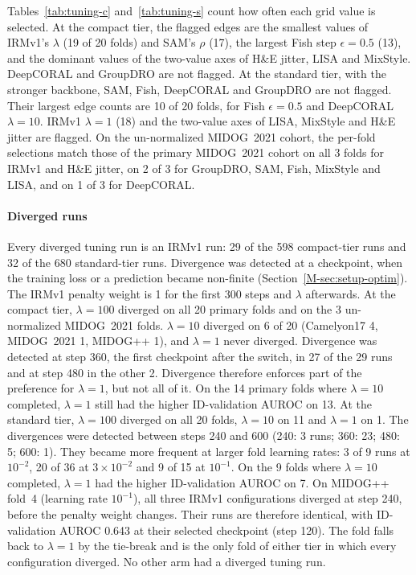 Tables~\ref{tab:tuning-c} and~\ref{tab:tuning-s} count how often each grid
value is selected. At the compact tier, the flagged edges are the smallest
values of IRMv1's $\lambda$ (19 of 20 folds) and SAM's $\rho$ (17), the largest
Fish step $\epsilon=0.5$ (13), and the dominant values of the two-value axes
of H\&E jitter, LISA and MixStyle. DeepCORAL and GroupDRO are not flagged. At
the standard tier, with the stronger backbone, SAM, Fish, DeepCORAL and
GroupDRO are not flagged. Their largest edge counts are 10 of 20 folds, for
Fish $\epsilon=0.5$ and DeepCORAL $\lambda=10$. IRMv1 $\lambda=1$ (18) and the
two-value axes of LISA, MixStyle and H\&E jitter are flagged. On the un-normalized
MIDOG~2021 cohort, the per-fold selections match those of the primary MIDOG~2021
cohort on all 3 folds for IRMv1 and H\&E jitter, on 2 of 3 for GroupDRO, SAM,
Fish, MixStyle and LISA, and on 1 of 3 for DeepCORAL.

\paragraph{Diverged runs} Every diverged tuning run is an IRMv1 run: 29 of the
598 compact-tier runs and 32 of the 680 standard-tier runs. Divergence was
detected at a checkpoint, when the training loss or a prediction became
non-finite (Section~\ref{M-sec:setup-optim}). The IRMv1 penalty weight is 1 for
the first 300 steps and $\lambda$ afterwards. At the compact tier, $\lambda=100$
diverged on all 20 primary folds and on the 3 un-normalized MIDOG~2021 folds.
$\lambda=10$ diverged on 6 of 20 (Camelyon17 4, MIDOG~2021 1, MIDOG++ 1), and
$\lambda=1$ never diverged. Divergence was detected at step 360, the first
checkpoint after the switch, in 27 of the 29 runs and at step 480 in the other
2. Divergence therefore enforces part of the preference for $\lambda=1$, but
not all of it. On the 14 primary folds where $\lambda=10$ completed,
$\lambda=1$ still had the higher ID-validation AUROC on 13. At the standard
tier, $\lambda=100$ diverged on all 20 folds, $\lambda=10$ on 11 and
$\lambda=1$ on 1. The divergences were detected between steps 240 and 600 (240:
3 runs; 360: 23; 480: 5; 600: 1). They became more frequent at larger fold
learning rates: 3 of 9 runs at $10^{-2}$, 20 of 36 at $3\times10^{-2}$ and 9 of
15 at $10^{-1}$. On the 9 folds where $\lambda=10$ completed, $\lambda=1$ had
the higher ID-validation AUROC on 7. On MIDOG++ fold~4 (learning rate
$10^{-1}$), all three IRMv1 configurations diverged at step 240, before the
penalty weight changes. Their runs are therefore identical, with
ID-validation AUROC 0.643 at their selected checkpoint (step 120). The fold
falls back to $\lambda=1$ by the tie-break and is the only fold of either tier
in which every configuration diverged. No other arm had a diverged tuning run.

